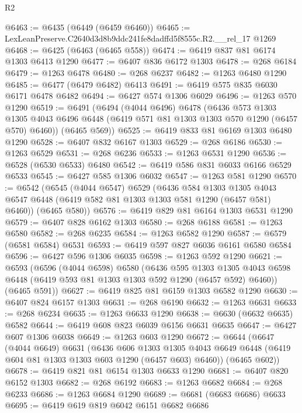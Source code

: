 \begin{lexlean}{R2}
\begin{coremodule}
@6463 := @6435 (@6449 (@6459 @6460))
@6465 := LexLeanPreserve.C2640d3d8b9ddc241fe8dadffd5f8555c.R2.__rel_17 @1269
@6468 := @6425 (@6463 (@6465 @558))
@6474 := @6419 @837 @81 @6174 @1303 @6413 @1290
@6477 := @6407 @836 @6172 @1303
@6478 := @268 @6184
@6479 := @1263 @6478
@6480 := @268 @6237
@6482 := @1263 @6480 @1290
@6485 := @6477 (@6479 @6482) @6413
@6491 := @6419 @575 @835 @6030 @6171 @6478 @6482
@6494 := @6427 @574 @1306 @6029
@6496 := @1263 @570 @1290
@6519 := @6491
    (@6494
      (@4044 @6496)
      @6478
      (@6436
        @573
        @1303
        @1305
        @4043
        @6496
        @6448
        (@6419 @571 @81 @1303 @1303 @570 @1290 (@6457 @570) @6460))
      (@6465 @569))
@6525 := @6419 @833 @81 @6169 @1303 @6480 @1290
@6528 := @6407 @832 @6167 @1303
@6529 := @268 @6186
@6530 := @1263 @6529
@6531 := @268 @6236
@6533 := @1263 @6531 @1290
@6536 := @6528 (@6530 @6533) @6480
@6542 := @6419 @586 @831 @6033 @6166 @6529 @6533
@6545 := @6427 @585 @1306 @6032
@6547 := @1263 @581 @1290
@6570 := @6542
    (@6545
      (@4044 @6547)
      @6529
      (@6436
        @584
        @1303
        @1305
        @4043
        @6547
        @6448
        (@6419 @582 @81 @1303 @1303 @581 @1290 (@6457 @581) @6460))
      (@6465 @580))
@6576 := @6419 @829 @81 @6164 @1303 @6531 @1290
@6579 := @6407 @828 @6162 @1303
@6580 := @268 @6188
@6581 := @1263 @6580
@6582 := @268 @6235
@6584 := @1263 @6582 @1290
@6587 := @6579 (@6581 @6584) @6531
@6593 := @6419 @597 @827 @6036 @6161 @6580 @6584
@6596 := @6427 @596 @1306 @6035
@6598 := @1263 @592 @1290
@6621 := @6593
    (@6596
      (@4044 @6598)
      @6580
      (@6436
        @595
        @1303
        @1305
        @4043
        @6598
        @6448
        (@6419 @593 @81 @1303 @1303 @592 @1290 (@6457 @592) @6460))
      (@6465 @591))
@6627 := @6419 @825 @81 @6159 @1303 @6582 @1290
@6630 := @6407 @824 @6157 @1303
@6631 := @268 @6190
@6632 := @1263 @6631
@6633 := @268 @6234
@6635 := @1263 @6633 @1290
@6638 := @6630 (@6632 @6635) @6582
@6644 := @6419 @608 @823 @6039 @6156 @6631 @6635
@6647 := @6427 @607 @1306 @6038
@6649 := @1263 @603 @1290
@6672 := @6644
    (@6647
      (@4044 @6649)
      @6631
      (@6436
        @606
        @1303
        @1305
        @4043
        @6649
        @6448
        (@6419 @604 @81 @1303 @1303 @603 @1290 (@6457 @603) @6460))
      (@6465 @602))
@6678 := @6419 @821 @81 @6154 @1303 @6633 @1290
@6681 := @6407 @820 @6152 @1303
@6682 := @268 @6192
@6683 := @1263 @6682
@6684 := @268 @6233
@6686 := @1263 @6684 @1290
@6689 := @6681 (@6683 @6686) @6633
@6695 := @6419 @619 @819 @6042 @6151 @6682 @6686

\end{coremodule}
\end{lexlean}
